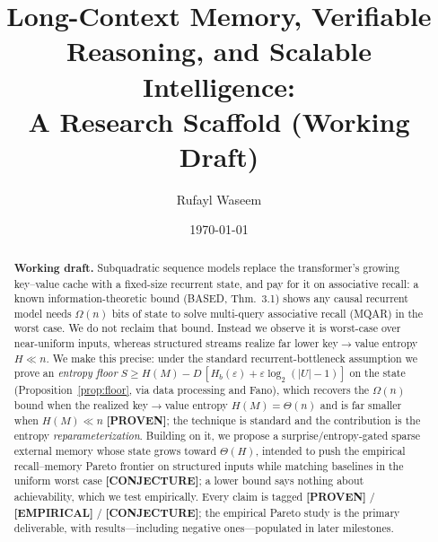 \documentclass[11pt]{article}
\title{Long-Context Memory, Verifiable Reasoning, and Scalable Intelligence:\\
A Research Scaffold (Working Draft)}
\author{Rufayl Waseem}
\date{\today}
\begin{document}
\maketitle

\begin{abstract}
\textbf{Working draft.} Subquadratic sequence models replace the transformer's growing
key--value cache with a fixed-size recurrent state, and pay for it on associative recall: a
known information-theoretic bound (BASED, Thm.~3.1) shows any causal recurrent model needs
$\Omega(n)$ bits of state to solve multi-query associative recall (MQAR) in the worst case. We do
not reclaim that bound. Instead we observe it is worst-case over near-uniform inputs, whereas
structured streams realize far lower key$\rightarrow$value entropy $H \ll n$. We make this
precise: under the standard recurrent-bottleneck assumption we prove an \emph{entropy floor}
$S \ge H(M) - D\,[H_b(\varepsilon) + \varepsilon \log_2(|U|-1)]$ on the state
(Proposition~\ref{prop:floor}, via data processing and Fano), which recovers the $\Omega(n)$ bound
when the realized key$\rightarrow$value entropy $H(M) = \Theta(n)$ and is far smaller when
$H(M) \ll n$ \textbf{[PROVEN]}; the technique is standard and the contribution is the entropy
\emph{reparameterization}. Building on it, we propose a surprise/entropy-gated sparse external
memory whose state grows toward $\Theta(H)$, intended to push the empirical recall--memory Pareto
frontier on structured inputs while matching baselines in the uniform worst case
\textbf{[CONJECTURE]}; a lower bound says nothing about achievability, which we test empirically. Every claim is tagged \textbf{[PROVEN]}
/ \textbf{[EMPIRICAL]} / \textbf{[CONJECTURE]}; the empirical Pareto study is the primary
deliverable, with results---including negative ones---populated in later milestones.
\end{abstract}












\end{document}

